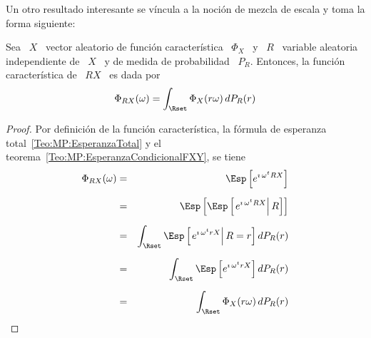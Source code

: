 {Un otro resultado  interesante se v\'incula a la noci\'on de  mezcla de escala y
toma la forma siguiente:
%
\begin{teorema}
  Sea \  $X$ \ vector aleatorio de  funci\'on caracter\'istica \ $\Phi_X$  \ y \
  $R$ \ variable aleatoria independiente de  \ $X$ \ y de medida de probabilidad
  \ $P_R$. Entonces, la funci\'on caracter\'istica de \ $R X$ \ es dada por
  \[
  \Phi_{R X}(\omega) = \int_\Rset \Phi_X(r \omega) \, dP_R(r)
  \]
\end{teorema}
%
\begin{proof}
  Por definici\'on  de la funci\'on caracter\'istica, la  f\'ormula de esperanza
  total~\ref{Teo:MP:EsperanzaTotal}                     y                     el
  teorema~\ref{Teo:MP:EsperanzaCondicionalFXY}, se tiene
  \begin{eqnarray*}
  \Phi_{R X}(\omega) & = & \Esp\left[ e^{\imath \, \omega^t R X} \right]\\[2mm]
  & = & \Esp\left[ \Esp\left[ \left. e^{\imath \, \omega^t R X} \right| R \right] \right]\\[2mm]
  & = & \int_\Rset \Esp\left[ \left. e^{\imath \, \omega^t r X} \right| R=r \right] dP_R(r)\\[2mm]
  & = & \int_\Rset \Esp\left[ e^{\imath \, \omega^t r X} \right] dP_R(r)\\[2mm]
  & = & \int_\Rset \Phi_X(r \omega) \, dP_R(r)
  \end{eqnarray*}
\end{proof}

 }






